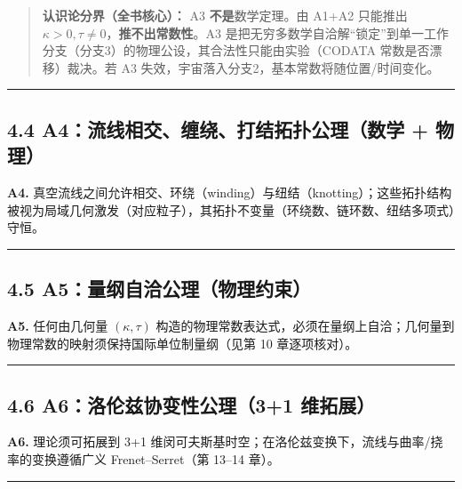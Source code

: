 \begin{quote}
\textbf{认识论分界（全书核心）：} A3 \textbf{不是}数学定理。由 A1+A2
只能推出 \(\kappa>0,\tau\neq0\)，\textbf{推不出常数性}。A3
是把无穷多数学自洽解``锁定''到单一工作分支（分支3）的物理公设，其合法性只能由实验（CODATA
常数是否漂移）裁决。若 A3
失效，宇宙落入分支2，基本常数将随位置/时间变化。
\end{quote}

\begin{center}\rule{0.5\linewidth}{0.5pt}\end{center}

\subsection{4.4 A4：流线相交、缠绕、打结拓扑公理（数学 +
物理）}\label{a4ux6d41ux7ebfux76f8ux4ea4ux7f20ux7ed5ux6253ux7ed3ux62d3ux6251ux516cux7406ux6570ux5b66-ux7269ux7406}

\textbf{A4.}
真空流线之间允许相交、环绕（winding）与纽结（knotting）；这些拓扑结构被视为局域几何激发（对应粒子），其拓扑不变量（环绕数、链环数、纽结多项式）守恒。

\begin{center}\rule{0.5\linewidth}{0.5pt}\end{center}

\subsection{4.5
A5：量纲自洽公理（物理约束）}\label{a5ux91cfux7eb2ux81eaux6d3dux516cux7406ux7269ux7406ux7ea6ux675f}

\textbf{A5.} 任何由几何量 \((\kappa,\tau)\)
构造的物理常数表达式，必须在量纲上自洽；几何量到物理常数的映射须保持国际单位制量纲（见第
10 章逐项核对）。

\begin{center}\rule{0.5\linewidth}{0.5pt}\end{center}

\subsection{4.6 A6：洛伦兹协变性公理（3+1
维拓展）}\label{a6ux6d1bux4f26ux5179ux534fux53d8ux6027ux516cux740631-ux7ef4ux62d3ux5c55}

\textbf{A6.} 理论须可拓展到 3+1
维闵可夫斯基时空；在洛伦兹变换下，流线与曲率/挠率的变换遵循广义
Frenet--Serret（第 13--14 章）。

\begin{center}\rule{0.5\linewidth}{0.5pt}\end{center}

